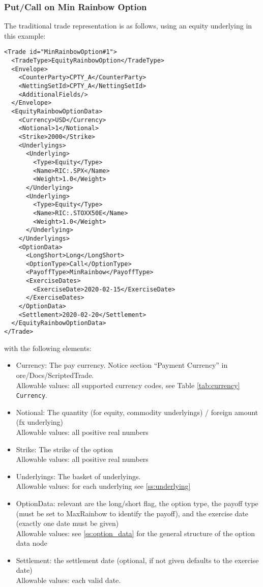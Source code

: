 \subsubsection*{Put/Call on Min Rainbow Option}

The traditional trade representation is as follows, using an equity underlying in this example:

\begin{verbatim}
<Trade id="MinRainbowOption#1">
  <TradeType>EquityRainbowOption</TradeType>
  <Envelope>
    <CounterParty>CPTY_A</CounterParty>
    <NettingSetId>CPTY_A</NettingSetId>
    <AdditionalFields/>
  </Envelope>
  <EquityRainbowOptionData>
    <Currency>USD</Currency>
    <Notional>1</Notional>
    <Strike>2000</Strike>
    <Underlyings>
      <Underlying>
        <Type>Equity</Type>
        <Name>RIC:.SPX</Name>
        <Weight>1.0</Weight>
      </Underlying>
      <Underlying>
        <Type>Equity</Type>
        <Name>RIC:.STOXX50E</Name>
        <Weight>1.0</Weight>
      </Underlying>
    </Underlyings>
    <OptionData>
      <LongShort>Long</LongShort>
      <OptionType>Call</OptionType>
      <PayoffType>MinRainbow</PayoffType>
      <ExerciseDates>
        <ExerciseDate>2020-02-15</ExerciseDate>
      </ExerciseDates>
    </OptionData>
    <Settlement>2020-02-20</Settlement>
  </EquityRainbowOptionData>
</Trade>
\end{verbatim}

with the following elements:

\begin{itemize}
\item Currency: The pay currency. Notice section ``Payment Currency'' in ore/Docs/ScriptedTrade. \\
  Allowable values: all supported currency codes, see Table \ref{tab:currency} \lstinline!Currency!.
\item Notional: The quantity (for equity, commodity underlyings) / foreign amount (fx underlying) \\
  Allowable values: all positive real numbers
\item Strike: The strike of the option \\
  Allowable values: all positive real numbers
\item Underlyings: The basket of underlyings. \\
  Allowable values: for each underlying see \ref{ss:underlying}
\item OptionData: relevant are the long/short flag, the option type, the payoff type (must be set to MaxRainbow to
  identify the payoff), and the exercise date (exactly one date must be given) \\
  Allowable values: see \ref{ss:option_data} for the general structure of the option data node
\item Settlement: the settlement date (optional, if not given defaults to the exercise date) \\
  Allowable values: each valid date.
\end{itemize}

